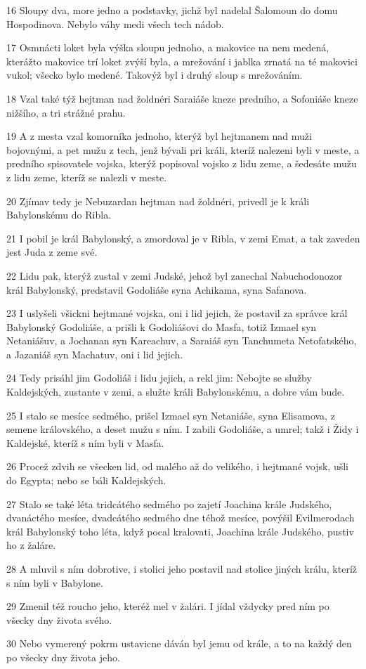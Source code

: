 \par 16 Sloupy dva, more jedno a podstavky, jichž byl nadelal Šalomoun do domu Hospodinova. Nebylo váhy medi všech tech nádob.
\par 17 Osmnácti loket byla výška sloupu jednoho, a makovice na nem medená, kterážto makovice trí loket zvýší byla, a mrežování i jablka zrnatá na té makovici vukol; všecko bylo medené. Takovýž byl i druhý sloup s mrežováním.
\par 18 Vzal také týž hejtman nad žoldnéri Saraiáše kneze predního, a Sofoniáše kneze nižšího, a tri strážné prahu.
\par 19 A z mesta vzal komorníka jednoho, kterýž byl hejtmanem nad muži bojovnými, a pet mužu z tech, jenž bývali pri králi, kteríž nalezeni byli v meste, a predního spisovatele vojska, kterýž popisoval vojsko z lidu zeme, a šedesáte mužu z lidu zeme, kteríž se nalezli v meste.
\par 20 Zjímav tedy je Nebuzardan hejtman nad žoldnéri, privedl je k králi Babylonskému do Ribla.
\par 21 I pobil je král Babylonský, a zmordoval je v Ribla, v zemi Emat, a tak zaveden jest Juda z zeme své.
\par 22 Lidu pak, kterýž zustal v zemi Judské, jehož byl zanechal Nabuchodonozor král Babylonský, predstavil Godoliáše syna Achikama, syna Safanova.
\par 23 I uslyšeli všickni hejtmané vojska, oni i lid jejich, že postavil za správce král Babylonský Godoliáše, a prišli k Godoliášovi do Masfa, totiž Izmael syn Netaniášuv, a Jochanan syn Kareachuv, a Saraiáš syn Tanchumeta Netofatského, a Jazaniáš syn Machatuv, oni i lid jejich.
\par 24 Tedy prisáhl jim Godoliáš i lidu jejich, a rekl jim: Nebojte se služby Kaldejských, zustante v zemi, a služte králi Babylonskému, a dobre vám bude.
\par 25 I stalo se mesíce sedmého, prišel Izmael syn Netaniáše, syna Elisamova, z semene královského, a deset mužu s ním. I zabili Godoliáše, a umrel; takž i Židy i Kaldejské, kteríž s ním byli v Masfa.
\par 26 Procež zdvih se všecken lid, od malého až do velikého, i hejtmané vojsk, ušli do Egypta; nebo se báli Kaldejských.
\par 27 Stalo se také léta tridcátého sedmého po zajetí Joachina krále Judského, dvanáctého mesíce, dvadcátého sedmého dne téhož mesíce, povýšil Evilmerodach král Babylonský toho léta, když pocal kralovati, Joachina krále Judského, pustiv ho z žaláre.
\par 28 A mluvil s ním dobrotive, i stolici jeho postavil nad stolice jiných králu, kteríž s ním byli v Babylone.
\par 29 Zmenil též roucho jeho, kteréž mel v žalári. I jídal vždycky pred ním po všecky dny života svého.
\par 30 Nebo vymerený pokrm ustavicne dáván byl jemu od krále, a to na každý den po všecky dny života jeho.

